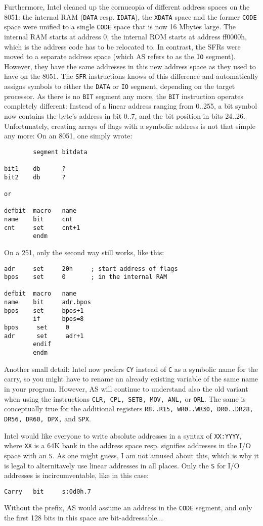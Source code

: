 \documentclass[12pt,twoside]{report}
\newcommand{\tty}[1]{{\tt #1}}
\newcommand{\asname}{{AS}}
\begin{document}
Furthermore, Intel cleaned up the cornucopia of different address
spaces on the 8051: the internal RAM (\tty{DATA} resp. \tty{IDATA}), the
\tty{XDATA} space and the former \tty{CODE} space were unified to a single
\tty{CODE} space that is now 16 Mbytes large.  The internal RAM starts at
address 0, the internal ROM starts at address ff0000h, which is the
address code has to be relocated to.  In contrast, the SFRs were moved to
a separate address space (which \asname{} refers to as the \tty{IO} segment).
However, they have the same addresses in this new address space as they
used to have on the 8051.  The \tty{SFR} instructions knows of this
difference and automatically assigns symbols to either the \tty{DATA} or
\tty{IO} segment, depending on the target processor.  As there is no
\tty{BIT} segment any more, the \tty{BIT} instruction operates completely
different: Instead of a linear address ranging from 0..255, a bit symbol
now contains the byte's address in bit 0..7, and the bit position in bits
24..26.  Unfortunately, creating arrays of flags with a symbolic address
is not that simple any more: On an 8051, one simply wrote:
\begin{verbatim}
        segment bitdata

bit1    db      ?
bit2    db      ?

or

defbit  macro   name
name    bit     cnt
cnt     set     cnt+1
        endm
\end{verbatim}
On a 251, only the second way still works, like this:
  \begin{verbatim}
adr     set     20h     ; start address of flags
bpos    set     0       ; in the internal RAM

defbit  macro   name
name    bit     adr.bpos
bpos    set     bpos+1
        if      bpos=8
bpos     set     0
adr      set     adr+1
        endif
        endm
\end{verbatim}
Another small detail: Intel now prefers \tty{CY} instead of \tty{C} as a
symbolic name for the carry, so you might have to rename an already
existing variable of the same name in your program.  However, \asname{} will
continue to understand also the old variant when using the instructions
\tty{CLR, CPL, SETB, MOV, ANL,} or \tty{ORL}.  The same is conceptually
true for the additional registers \tty{R8..R15, WR0..WR30, DR0..DR28, DR56,
DR60, DPX,} and \tty{SPX}.

Intel would like everyone to write absolute addresses in a syntax of
\tty{XX:YYYY}, where \tty{XX} is a 64K bank in the address space resp.
signifies addresses in the I/O space with an \tty{S}.  As one might guess,
I am not amused about this, which is why it is legal to alternitavely use
linear addresses in all places.  Only the \tty{S} for I/O addresses is
incircumventable, like in this case:
\begin{verbatim}
Carry   bit     s:0d0h.7
\end{verbatim}
Without the prefix, \asname{} would assume an address in the \tty{CODE} segment,
and only the first 128 bits in this space are bit-addressable...
\end{document}
